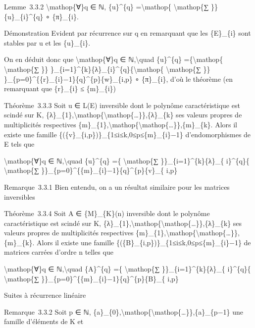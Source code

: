 \documentclass[]{article}
\begin{document}
Lemme~3.3.2 \textbackslash{}mathop\{∀\}q ∈ ℕ, \{u\}\^{}\{q\}
=\textbackslash{}mathop\{ \textbackslash{}mathop\{∑ \}\}
\{u\}\_\{i\}\^{}\{q\} ∘ \{π\}\_\{i\}.

Démonstration Evident par récurrence sur q en remarquant que les
\{E\}\_\{i\} sont stables par u et les \{u\}\_\{i\}.

On en déduit donc que \textbackslash{}mathop\{∀\}q ∈
ℕ,\textbackslash{}quad \{u\}\^{}\{q\} =\{\textbackslash{}mathop\{
\textbackslash{}mathop\{∑ \}\}
\}\_\{i=1\}\^{}\{k\}\{λ\}\_\{i\}\^{}\{q\}\{\textbackslash{}mathop\{
\textbackslash{}mathop\{∑ \}\}
\}\_\{p=0\}\^{}\{\{r\}\_\{i\}−1\}\{q\}\^{}\{p\}\{w\}\_\{i,p\} ∘
\{π\}\_\{i\}, d'où le théorème (en remarquant que \{r\}\_\{i\} ≤
\{m\}\_\{i\})

Théorème~3.3.3 Soit u ∈ L(E) inversible dont le polynôme caractéristique
est scindé sur K,
\{λ\}\_\{1\},\textbackslash{}mathop\{\textbackslash{}mathop\{\ldots{}\}\},\{λ\}\_\{k\}
ses valeurs propres de multiplicités respectives
\{m\}\_\{1\},\textbackslash{}mathop\{\textbackslash{}mathop\{\ldots{}\}\},\{m\}\_\{k\}.
Alors il existe une famille
\{(\{v\}\_\{i,p\})\}\_\{1≤i≤k,0≤p≤\{m\}\_\{i\}−1\} d'endomorphismes de E
tels que

\textbackslash{}mathop\{∀\}q ∈ ℕ,\textbackslash{}quad \{u\}\^{}\{q\} =\{
\textbackslash{}mathop\{∑ \}\}\_\{i=1\}\^{}\{k\}\{λ\}\_\{ i\}\^{}\{q\}\{
\textbackslash{}mathop\{∑
\}\}\_\{p=0\}\^{}\{\{m\}\_\{i\}−1\}\{q\}\^{}\{p\}\{v\}\_\{ i,p\}

Remarque~3.3.1 Bien entendu, on a un résultat similaire pour les
matrices inversibles

Théorème~3.3.4 Soit A ∈ \{M\}\_\{K\}(n) inversible dont le polynôme
caractéristique est scindé sur K,
\{λ\}\_\{1\},\textbackslash{}mathop\{\textbackslash{}mathop\{\ldots{}\}\},\{λ\}\_\{k\}
ses valeurs propres de multiplicités respectives
\{m\}\_\{1\},\textbackslash{}mathop\{\textbackslash{}mathop\{\ldots{}\}\},\{m\}\_\{k\}.
Alors il existe une famille
\{(\{B\}\_\{i,p\})\}\_\{1≤i≤k,0≤p≤\{m\}\_\{i\}−1\} de matrices carrées
d'ordre n telles que

\textbackslash{}mathop\{∀\}q ∈ ℕ,\textbackslash{}quad \{A\}\^{}\{q\} =\{
\textbackslash{}mathop\{∑ \}\}\_\{i=1\}\^{}\{k\}\{λ\}\_\{ i\}\^{}\{q\}\{
\textbackslash{}mathop\{∑
\}\}\_\{p=0\}\^{}\{\{m\}\_\{i\}−1\}\{q\}\^{}\{p\}\{B\}\_\{ i,p\}

Suites à récurrence linéaire

Remarque~3.3.2 Soit p ∈ ℕ,
\{a\}\_\{0\},\textbackslash{}mathop\{\textbackslash{}mathop\{\ldots{}\}\},\{a\}\_\{p−1\}
une famille d'éléments de K et
\end{document}
